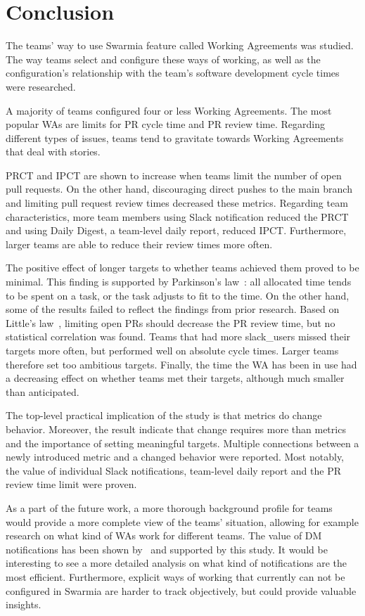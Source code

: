 \chapter{Conclusion}

The teams' way to use Swarmia feature called Working Agreements was studied. The way teams select and configure these ways of working, as well as the configuration's relationship with the team's software development cycle times were researched. 

A majority of teams configured four or less Working Agreements. The most popular WAs are limits for PR cycle time and PR review time. Regarding different types of issues, teams tend to gravitate towards Working Agreements that deal with stories. 

PRCT and IPCT are shown to increase when teams limit the number of open pull requests. On the other hand, discouraging direct pushes to the main branch and limiting pull request review times decreased these metrics. Regarding team characteristics, more team members using Slack notification reduced the PRCT and using Daily Digest, a team-level daily report, reduced IPCT. Furthermore, larger teams are able to reduce their review times more often.

The positive effect of longer targets to whether teams achieved them proved to be minimal. This finding is supported by Parkinson's law~\cite{parkinson_cyril_parkinsons_1955}: all allocated time tends to be spent on a task, or the task adjusts to fit to the time. On the other hand, some of the results failed to reflect the findings from prior research. Based on Little's law~\cite{chhajed_building_2008}, limiting open PRs should decrease the PR review time, but no statistical correlation was found. Teams that had more slack\_users missed their targets more often, but performed well on absolute cycle times. Larger teams therefore set too ambitious targets. Finally, the time the WA has been in use had a decreasing effect on whether teams met their targets, although much smaller than anticipated. 

The top-level practical implication of the study is that metrics do change behavior. Moreover, the result indicate that change requires more than metrics and the importance of setting meaningful targets. Multiple connections between a newly introduced metric and a changed behavior were reported. Most notably, the value of individual Slack notifications, team-level daily report and the PR review time limit were proven. 

As a part of the future work, a more thorough background profile for teams would provide a more complete view of the teams' situation, allowing for example research on what kind of WAs work for different teams. The value of DM notifications has been shown by~\citet{maddila_nudge_2022} and supported by this study. It would be interesting to see a more detailed analysis on what kind of notifications are the most efficient. Furthermore, explicit ways of working that currently can not be configured in Swarmia are harder to track objectively, but could provide valuable insights. 

\listoftodos